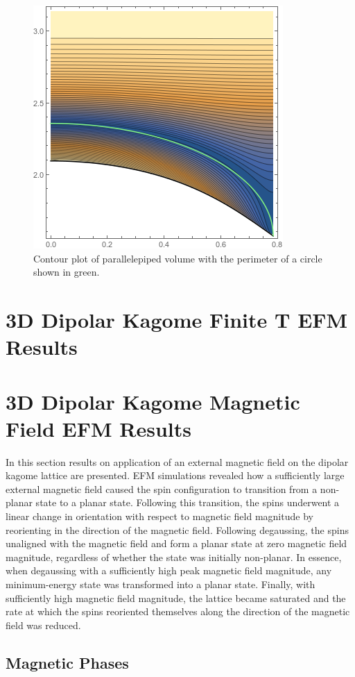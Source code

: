 \begin{figure}[h]
\includegraphics[width=.5\linewidth]{img/groundstatevol_withplanarborder.png} 
    \caption{Contour plot of parallelepiped volume with the perimeter of a circle shown in green.} 
\end{figure}
\clearpage
\section{3D Dipolar Kagome Finite T EFM Results}


\section{3D Dipolar Kagome Magnetic Field EFM Results}

In this section results on application of an external magnetic field on the dipolar kagome lattice are presented. EFM simulations revealed how a sufficiently large external magnetic field caused the spin configuration to transition from a non-planar state to a planar state. Following this transition, the spins underwent a linear change in orientation with respect to magnetic field magnitude by reorienting in the direction of the magnetic field. Following degaussing, the spins unaligned with the magnetic field and form a planar state at zero magnetic field magnitude, regardless of whether the state was initially non-planar. In essence, when degaussing with a sufficiently high peak magnetic field magnitude, any minimum-energy state was transformed into a planar state. Finally, with sufficiently high magnetic field magnitude, the lattice became saturated and the rate at which the spins reoriented themselves along the direction of the magnetic field was reduced. 

\subsection{Magnetic Phases}

